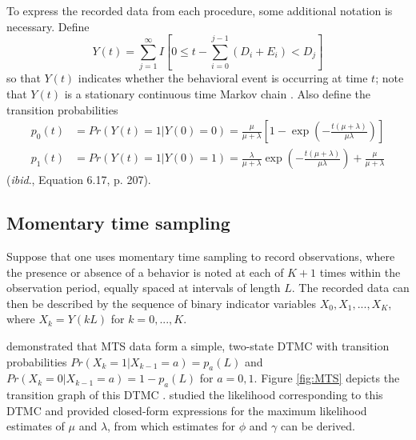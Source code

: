 \documentclass[11pt]{article}
\begin{document}
To express the recorded data from each procedure, some additional notation is necessary. Define \[
Y(t) = \sum_{j=1}^{\infty} I \left[ 0 \leq t - \sum_{i=0}^{j-1} (D_i + E_i) < D_j \right]
\]
so that $Y(t)$ indicates whether the behavioral event is occurring at time $t$; note that $Y(t)$ is a stationary continuous time Markov chain \citep[Theorem 6.1, p. 192]{Kulkarni2010modeling}. Also define the transition probabilities \begin{align*}
p_0(t) &= Pr(Y(t) = 1 | Y(0) = 0) = \frac{\mu}{\mu + \lambda} \left[1 - \exp\left(-\frac{t(\mu + \lambda)}{\mu \lambda}\right)\right] \\
p_1(t) &= Pr(Y(t) = 1 | Y(0) = 1) = \frac{\lambda}{\mu + \lambda} \exp\left(-\frac{t(\mu + \lambda)}{\mu \lambda}\right) + \frac{\mu}{\mu + \lambda}
\end{align*}
(\textit{ibid}., Equation 6.17, p. 207). 

\subsection{Momentary time sampling}
\label{sec:MTS}

Suppose that one uses momentary time sampling to record observations, where the presence or absence of a behavior is noted at each of $K+1$ times within the observation period, equally spaced at intervals of length $L$. The recorded data can then be described by the sequence of binary indicator variables $X_0,X_1,...,X_K$, where $X_k = Y(kL)$ for $k = 0,...,K$. 

\citet{Brown1977estimation} demonstrated that MTS data form a simple, two-state DTMC with transition probabilities $Pr(X_k = 1 | X_{k-1} = a) = p_a(L)$ and $Pr(X_k = 0 | X_{k-1} = a) = 1 - p_a(L)$ for $a = 0,1$. Figure \ref{fig:MTS} depicts the transition graph of this DTMC \citep[on the interpretation of transition graphs, see][p. 12]{Kulkarni2010modeling}. \citet{Brown1977estimation} studied the likelihood corresponding to this DTMC and provided closed-form expressions for the maximum likelihood estimates of $\mu$ and $\lambda$, from which estimates for $\phi$ and $\gamma$ can be derived.

\begin{figure}[htbp]
\end{figure}	
\end{document}
